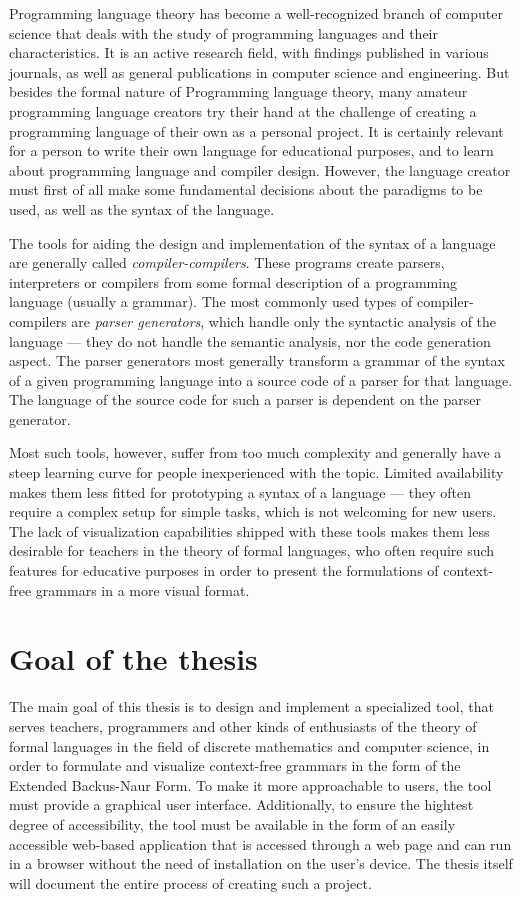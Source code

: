 \documentclass[english,engineering]{wizthesis}
\begin{document}
Programming language theory has become a well-recognized branch of computer
science that deals with the study of programming languages and their
characteristics. It is an active research field, with findings published in
various journals, as well as general publications in computer science and
engineering. But besides the formal nature of Programming language theory, many
amateur programming language creators try their hand at the challenge of
creating a programming language of their own as a personal project. It is
certainly relevant for a person to write their own language for educational
purposes, and to learn about programming language and compiler design. However,
the language creator must first of all make some fundamental decisions about the
paradigms to be used, as well as the syntax of the language.

The tools for aiding the design and implementation of the syntax of a language
are generally called \emph{compiler-compilers}. These programs create parsers,
interpreters or compilers from some formal description of a programming
language (usually a grammar). The most commonly used types of
compiler-compilers are \emph{parser generators}, which handle only the
syntactic analysis of the language --- they do not handle the semantic analysis,
nor the code generation aspect. The parser generators most generally transform a
grammar of the syntax of a given programming language into a source code of a
parser for that language. The language of the source code for such a parser is
dependent on the parser generator.

Most such tools, however, suffer from too much complexity and generally have a
steep learning curve for people inexperienced with the topic. Limited
availability makes them less fitted for prototyping a syntax of a language ---
they often require a complex setup for simple tasks, which is not welcoming for
new users. The lack of visualization capabilities shipped with these tools makes
them less desirable for teachers in the theory of formal languages, who often
require such features for educative purposes in order to present the
formulations of context-free grammars in a more visual format.

\section{Goal of the thesis}

The main goal of this thesis is to design and implement a specialized tool, that
serves teachers, programmers and other kinds of enthusiasts of the theory of
formal languages in the field of discrete mathematics and computer science, in
order to formulate and visualize context-free grammars in the form of the
Extended Backus-Naur Form. To make it more approachable to users, the
tool must provide a graphical user interface. Additionally, to ensure the
hightest degree of accessibility, the tool must be available in the form of an
easily accessible web-based application that is accessed through a web page and
can run in a browser without the need of installation on the user's device. The
thesis itself will document the entire process of creating such a project.
\end{document}
